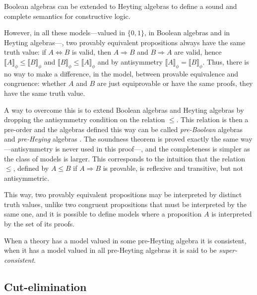 \documentclass{llncs}
\begin{document}
Boolean algebras can be extended to Heyting algebras to define 
a sound and complete semantics for constructive logic.

However, in all these models---valued in $\{0,1\}$, in Boolean algebras and 
in Heyting algebras---, two provably equivalent propositions always have the
same truth value: if $A \Leftrightarrow B$ is valid, then $A
\Rightarrow B$ and $B \Rightarrow A$ are valid, hence $\llbracket A
\rrbracket_{\phi} \leq \llbracket B \rrbracket_{\phi}$ and $\llbracket
B \rrbracket_{\phi} \leq \llbracket A \rrbracket_{\phi}$ and by
antisymmetry $\llbracket A \rrbracket_{\phi} = \llbracket B
\rrbracket_{\phi}$.  Thus, there is no way to make a difference, in the
model, between provable equivalence and congruence: whether $A$ and $B$
are just equiprovable or have the same proofs, they have the same
truth value.

A way to overcome this is to extend Boolean algebras and Heyting
algebras by dropping the antisymmetry condition on the relation
$\leq$. This relation is then a pre-order and the algebras defined
this way can be called {\em pre-Boolean} algebras \cite{BHH} and {\em
  pre-Heying} algebras \cite{TVA}. The soundness theorem is
proved exactly the same way---antisymmetry is never used in this
proof---, and the completeness is simpler as the class of models is
larger. This corresponds to the intuition that the relation
$\leq$, defined by $A \leq B$ if $A \Rightarrow B$ is provable,
is reflexive and transitive, but not antisymmetric.

This way, two provably equivalent propositions may be interpreted by 
distinct truth values, unlike two congruent propositions that must 
be interpreted by the same one, and it is possible to define models 
where a proposition $A$ is interpreted by the set of its proofs. 

When a theory has a model valued in some pre-Heyting algebra 
it is consistent, when it has a model valued in all pre-Heyting algebras
it is said to be {\em super-consistent}. 

\subsection{Cut-elimination}
\end{document}
